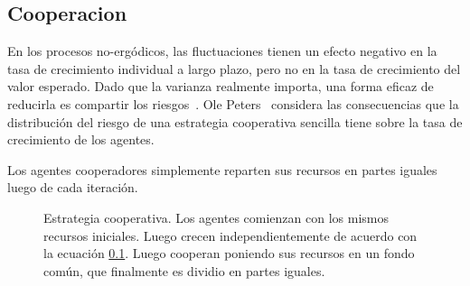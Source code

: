\documentclass[a4paper,10pt]{article}
\begin{document}
\subsection{Cooperacion}

En los procesos no-ergódicos, las fluctuaciones tienen un efecto negativo en la tasa de crecimiento individual a largo plazo, pero no en la tasa de crecimiento del valor esperado.
Dado que la varianza realmente importa, una forma eficaz de reducirla es compartir los riesgos~\cite{yaari2010-cooperationEvolution, peters2015-evolutionaryAdvantageOfCooperation}.
Ole Peters~\cite{peters2015-evolutionaryAdvantageOfCooperation} considera las consecuencias que la distribución del riesgo de una estrategia cooperativa sencilla tiene sobre la tasa de crecimiento de los agentes.

Los agentes cooperadores simplemente reparten sus recursos en partes iguales luego de cada iteración.

\begin{figure}[H]
\centering
{}
\caption{Estrategia cooperativa. Los agentes comienzan con los mismos recursos iniciales. Luego crecen independientemente de acuerdo con la ecuaci\'on \ref{}. Luego cooperan poniendo sus recursos en un fondo común, que finalmente es dividio en partes iguales.}
\label{fig:protocolo}
\end{figure}
\end{document}
